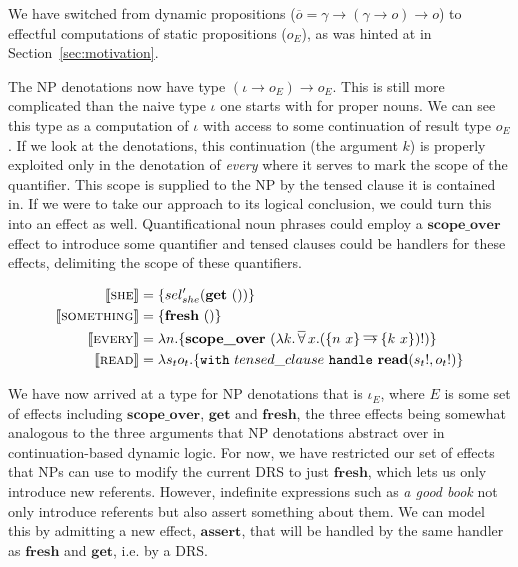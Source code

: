 \documentclass[a4paper,11pt]{easychair}
\newcommand{\dimpl}{\mathbin{\overline{\to}}}
\newcommand{\dforall}{\mathop{\overline{\forall}}}
\newcommand{\sem}[1]{\llbracket #1 \rrbracket}
\newcommand{\keyword}[1]{\texttt{#1}}
\newcommand{\effect}[1]{\textbf{#1}}
\newcommand{\semdom}[1]{\textbf{#1}}
\newcommand{\handle}[2]{\keyword{with}\ #1\ \keyword{handle}\ #2}
\begin{document}
We have switched from dynamic propositions ($\overline{o} = \gamma \to (\gamma
\to o) \to o$) to effectful computations of static propositions ($o_E$), as
was hinted at in Section~\ref{sec:motivation}.

The NP denotations now have type $(\iota \to o_E) \to o_E$. This is still more
complicated than the naive type $\iota$ one starts with for proper nouns. We
can see this type as a computation of $\iota$ with access to some continuation
of result type $o_E$. If we look at the denotations, this continuation (the
argument $k$) is properly exploited only in the denotation of \emph{every}
where it serves to mark the scope of the quantifier. This scope is supplied to
the NP by the tensed clause it is contained in. If we were to take our
approach to its logical conclusion, we could turn this into an effect as
well. Quantificational noun phrases could employ a $\effect{scope\_over}$
effect to introduce some quantifier and tensed clauses could be handlers for
these effects, delimiting the scope of these quantifiers.

\vspace{-4mm}

\begin{align*}
  \sem{\textsc{she}} &= \{ sel_{she}' (\effect{get}\ ()) \} \\
  \sem{\textsc{something}} &= \{ \effect{fresh}\ () \} \\
  \sem{\textsc{every}} &= \lambda n. \{ \effect{scope\_over}\ (\lambda
  k. \dforall x. (\{n\ x\} \dimpl \{k\ x\})!) \} \\
  \sem{\textsc{read}} &= \lambda s_t o_t. \{ \handle{tensed\_clause}{\semdom{read}(s_t!, o_t!)} \}
\end{align*}

We have now arrived at a type for NP denotations that is $\iota_E$, where $E$
is some set of effects including $\effect{scope\_over}$, $\effect{get}$ and
$\effect{fresh}$, the three effects being somewhat analogous to the three
arguments that NP denotations abstract over in continuation-based dynamic
logic. For now, we have restricted our set of effects that NPs can use to
modify the current DRS to just $\effect{fresh}$, which lets us only introduce
new referents. However, indefinite expressions such as \emph{a good book} not
only introduce referents but also assert something about them. We can model
this by admitting a new effect, $\effect{assert}$, that will be handled by the
same handler as $\effect{fresh}$ and $\effect{get}$, i.e. by a DRS.
\end{document}
